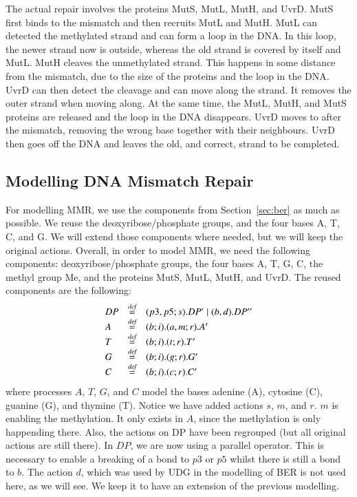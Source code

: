 The actual repair involves the proteins MutS, MutL, MutH, and UvrD. MutS first binds to the mismatch and then recruits MutL and MutH. MutL can detected the methylated strand and can form a loop in the DNA. In this loop, the newer strand now is outside, whereas the old strand is covered by itself and MutL. MutH cleaves the unmethylated strand. This happens in some distance from the mismatch, due to the size of the proteins and the loop in the DNA. UvrD can then detect the cleavage and can move along the strand. It removes the outer strand when moving along. At the same time, the MutL, MutH, and MutS proteins are released and the loop in the DNA disappears. UvrD moves to after the mismatch, removing the wrong base together with their neighbours. UvrD then goes off the DNA and leaves the old, and correct, strand to be completed. 

\subsection{Modelling DNA Mismatch Repair}

For modelling MMR, we use the components from Section~\ref{sec:ber} as much as possible. We reuse the deoxyribose/phosphate groups, and the four bases A, T, C, and G. We will extend those components where needed, but we will keep the original actions. Overall, in order to model MMR, we need the following components: deoxyribose/phosphate groups, the four bases A, T, G, C, the methyl group Me, and the proteins MutS, MutL, MutH, and UvrD. The reused components are the following:
%
$$\begin{array}{lll}
DP & \stackrel{\emph{def}}{=} & (p3,p5;s).DP' \; \vert \; (b,d).DP''\\
A & \stackrel{\emph{def}}{=} & (b;i).(a,m;r).A'\\
T & \stackrel{\emph{def}}{=} & (b;i).(t;r).T'\\
G & \stackrel{\emph{def}}{=} & (b;i).(g;r).G'\\
C & \stackrel{\emph{def}}{=} & (b;i).(c;r).C'\\
\end{array}$$
%
where processes $A$, $T$, $G$, and $C$ model the bases adenine (A), cytosine (C), guanine (G), and thymine (T). Notice we have added actions $s$, $m$, and $r$. $m$ is enabling the methylation. It only exists in $A$, since the methylation is only happending there. Also, the actions on DP have been regrouped (but all original actions are still there). In $DP$, we are now using a parallel operator. This is necessary to enable a breaking of a bond to $p3$ or $p5$ whilst there is still a bond to $b$. The action $d$, which was used by UDG in the modelling of BER is not used here, as we will see. We keep it to have an extension of the previous modelling.

